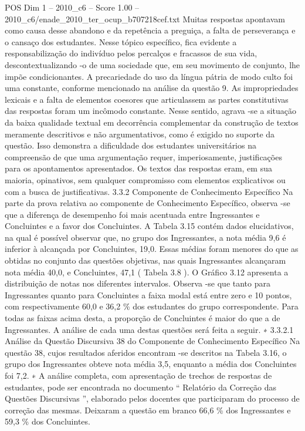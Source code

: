 \begin{textsample}{POS Dim 1 – 2010\_c6 – Score 1.00 – 2010\_c6/enade\_2010\_ter\_ocup\_b707218cef.txt}
Muitas respostas apontavam como causa desse abandono e da repetência a preguiça, a falta de perseverança e o cansaço dos estudantes.
Nesse tópico específico, fica evidente a responsabilização do indivíduo pelos percalços e fracassos de sua vida, descontextualizando -o de uma sociedade que, em seu movimento de conjunto, lhe impõe condicionantes.
A precariedade do uso da língua pátria de modo culto foi uma constante, conforme mencionado na análise da questão 9.
As impropriedades lexicais e a falta de elementos coesores que articulassem as partes constitutivas das respostas foram um incômodo constante.
Nesse sentido, agrava -se a situação da baixa qualidade textual em decorrência complementar da construção de textos meramente descritivos e não argumentativos, como é exigido no suporte da questão.
Isso demonstra a dificuldade dos estudantes universitários na compreensão de que uma argumentação requer, imperiosamente, justificações para os apontamentos apresentados.
Os textos das respostas eram, em sua maioria, opinativos, sem qualquer compromisso com elementos explicativos ou com a busca de justificativas. 3.3.2 Componente de Conhecimento Específico Na parte da prova relativa ao componente de Conhecimento Específico, observa -se que a diferença de desempenho foi mais acentuada entre Ingressantes e Concluintes e a favor dos Concluintes.
A Tabela 3.15 contém dados elucidativos, na qual é possível observar que, no grupo dos Ingressantes, a nota média 9,6 é inferior à alcançada por Concluintes, 19,0.
Essas médias foram menores do que as obtidas no conjunto das questões objetivas, nas quais Ingressantes alcançaram nota média 40,0, e Concluintes, 47,1 ( Tabela 3.8 ).
O Gráfico 3.12 apresenta a distribuição de notas nos diferentes intervalos.
Observa -se que tanto para Ingressantes quanto para Concluintes a faixa modal está entre zero e 10 pontos, com respectivamente 60,0 e 36,2 \% dos estudantes do grupo correspondente.
Para todas as faixas acima desta, a proporção de Concluintes é maior do que a de Ingressantes.
A análise de cada uma destas questões será feita a seguir. ∗ 3.3.2.1 Análise da Questão Discursiva 38 do Componente de Conhecimento Específico Na questão 38, cujos resultados aferidos encontram -se descritos na Tabela 3.16, o grupo dos Ingressantes obteve nota média 3,5, enquanto a média dos Concluintes foi 7,2. ∗ A análise completa, com apresentação de trechos de respostas de estudantes, pode ser encontrada no documento “ Relatório da Correção das Questões Discursivas ”, elaborado pelos docentes que participaram do processo de correção das mesmas.
Deixaram a questão em branco 66,6 \% dos Ingressantes e 59,3 \% dos Concluintes.

\end{textsample}
